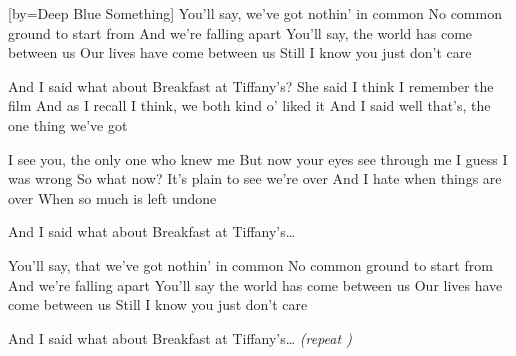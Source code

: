 [by={Deep Blue Something}]
\beginverse
You'll say, we've got nothin' in common
No common ground to start from
And we're falling apart
You'll say, the world has come between us
Our lives have come between us
Still I know you just don't care
\endverse

\beginchorus
And I said what about Breakfast at Tiffany's?
She said I think I remember the film
And as I recall I think, we both kind o' liked it
And I said well that's, the one thing we've got
\endchorus

\beginverse
I see you, the only one who knew me
But now your eyes see through me
I guess I was wrong
So what now? 
It's plain to see we're over
And I hate when things are over
When so much is left undone
\endverse

\beginchorus
And I said what about Breakfast at Tiffany's\dots
\endchorus

\beginverse
You'll say, that we've got nothin' in common
No common ground to start from
And we're falling apart
You'll say the world has come between us
Our lives have come between us
Still I know you just don't care
\endverse 

\beginchorus
And I said what about Breakfast at Tiffany's\dots
\textit{(repeat )}
\endchorus
\endsong